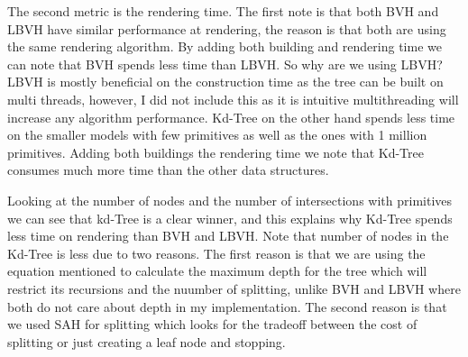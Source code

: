 \documentclass[11pt,a4paper]{article}
\begin{document}
The second metric is the rendering time.  The first note is that both BVH and LBVH have similar performance at rendering, the reason is that both are using the same rendering algorithm. By adding both building and rendering time we can note that BVH spends less time than LBVH. So why are we using LBVH? LBVH is mostly beneficial on the construction time as the tree can be built on multi threads, however, I did not include this as it is intuitive multithreading will increase any algorithm performance. Kd-Tree on the other hand spends less time on the smaller models with few primitives as well as the ones with 1 million primitives. Adding both buildings the rendering time we note that Kd-Tree consumes much more time than the other data structures. 
\\
\noindent

Looking at the number of nodes and the number of intersections with primitives we can see that kd-Tree is a clear winner, and this explains why Kd-Tree spends less time on rendering than BVH and LBVH. Note that number of nodes in the Kd-Tree is less due to two reasons. The first reason is that we are using the equation mentioned to calculate the maximum depth for the tree which will restrict its recursions and the nuumber of splitting, unlike BVH and LBVH where both do not care about depth in my implementation.  The second reason is that we used SAH for splitting which looks for the tradeoff between the cost of splitting or just creating a leaf node and stopping. 
\\
\noindent
\end{document}
